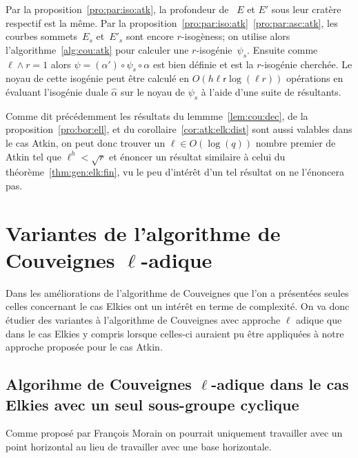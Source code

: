 \documentclass[10pt,a4paper]{book}
\theoremstyle{plain}
\newtheorem{thm}{Théorème}[chapter]
\theoremstyle{definition}
\theoremstyle{definition}
\theoremstyle{definition}
\theoremstyle{definition}
\theoremstyle{remark}
\theoremstyle{remark}
\theoremstyle{definition}
\begin{document}
Par la proposition~\ref{pro:par:iso:atk}, la profondeur de ~$E$ et $E'$ sous
leur cratère respectif est la même.  Par la
proposition~\ref{pro:par:iso:atk}~\ref{pro:par:asc:atk}, les
courbes sommets~$E_{s}$ et~$E'_{s}$ sont encore $r$-isogèness; on utilise
alors l'algorithme~\ref{alg:cou:atk} pour calculer une $r$-isogénie~$\psi_{s}$.  
Ensuite comme $\ell \wedge r =1$ alors $\psi = (\alpha ') \circ \psi_{s} \circ 
\alpha$ est bien définie et est la $r$-isogénie cherchée.
Le noyau de cette isogénie peut être calculé en $O(h\mathsf{\ell r}\log(\ell r))$
opérations en évaluant l'isogénie duale $\widehat{\alpha}$ sur le noyau de 
$\psi_s$ à l'aide d'une suite de résultants. 

Comme dit précédemment les résultats du lemmme~\ref{lem:cou:dec}, de la proposition~\ref{pro:bor:ell},
 et du corollaire~\ref{cor:atk:elk:dist} sont 
aussi valables dans le cas Atkin, on peut donc trouver un $\ell \in O(\log(q))$
nombre premier de Atkin tel que $\ell^h<\sqrt{r}$ et énoncer un résultat 
similaire à celui du théorème~\ref{thm:gen:elk:fin}, vu le peu d'intérêt d'un 
tel résultat on ne l'énoncera pas. 



\chapter{Variantes de l'algorithme de Couveignes $\ell$-adique}
Dans les améliorations de l'algorithme de Couveignes que l'on a présentées 
seules celles concernant le cas Elkies ont un intérêt en terme de complexité. 
On va donc étudier des variantes à l'algorithme de Couveignes avec 
approche $\ell$ adique que dans le cas Elkies y compris lorsque celles-ci
auraient pu être appliquées à notre approche proposée pour le cas Atkin.
\section{Algorihme de Couveignes $\ell$-adique dans le cas Elkies avec un seul sous-groupe cyclique}
\label{sec:var:cou:uni}
Comme proposé par François Morain on pourrait uniquement travailler avec un 
point horizontal au lieu de travailler avec une base horizontale.
\end{document}
